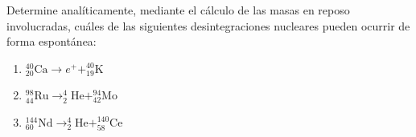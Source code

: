 \item Determine analíticamente, mediante el cálculo de las masas en reposo involucradas, cuáles de las siguientes desintegraciones nucleares pueden ocurrir de forma espontánea:
\begin{enumerate}
    \item $^{40}_{20}\text{Ca} \to e^+ + ^{40}_{19}\text{K}$
    \item $^{98}_{44}\text{Ru} \to ^{4}_{2}\text{He} + ^{94}_{42}\text{Mo}$
    \item $^{144}_{60}\text{Nd} \to ^{4}_{2}\text{He} + ^{140}_{58}\text{Ce}$
\end{enumerate}